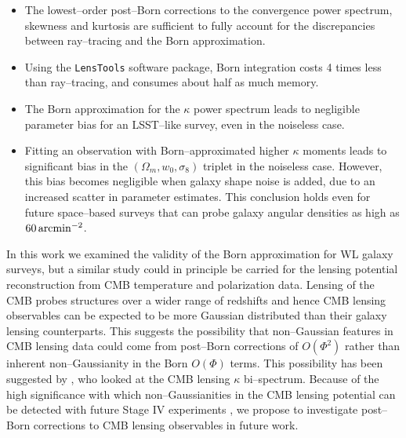 \documentclass[reprint,aps,prd,superscriptaddress,showkeys,showpacs]{revtex4-1}
\newcommand{\ttt}[1]{\texttt{#1}}
\begin{document}
\begin{itemize}
\item The lowest--order post--Born corrections to the convergence power spectrum, skewness and kurtosis are sufficient to fully account for the discrepancies between ray--tracing and the Born approximation.
\item Using the \ttt{LensTools} software package, Born integration costs 4 times less than ray--tracing, and consumes about half as much memory.
\item The Born approximation for the $\kappa$ power spectrum leads to negligible parameter bias for an LSST--like survey, even in the noiseless case.
\item Fitting an observation with Born--approximated higher $\kappa$ moments leads to significant bias in the $(\Omega_m,w_0,\sigma_8)$ triplet in the noiseless case. However, this bias becomes negligible when galaxy shape noise is added, due to an increased scatter in parameter estimates. This conclusion holds even for future space--based surveys that can probe galaxy angular densities as high as $60\,{\rm arcmin}^{-2}$.    
\end{itemize}
%
In this work we examined the validity of the Born approximation for WL galaxy surveys, but a similar study could in principle be carried for the lensing potential reconstruction from CMB temperature and polarization data. Lensing of the CMB probes structures over a wider range of redshifts and hence CMB lensing observables can be expected to be more Gaussian distributed than their galaxy lensing counterparts. This suggests the possibility that non--Gaussian features in CMB lensing data could come from post--Born corrections of $O(\Phi^2)$ rather than inherent non--Gaussianity in the Born $O(\Phi)$ terms. This possibility has been suggested by \citep{CMBPrattenLewis}, who looked at the CMB lensing $\kappa$ bi--spectrum. Because of the high significance with which non--Gaussianities in the CMB lensing potential can be detected with future Stage IV experiments \citep{CMBLNG}, we propose to investigate post--Born corrections to CMB lensing observables in future work.  

\end{document}
